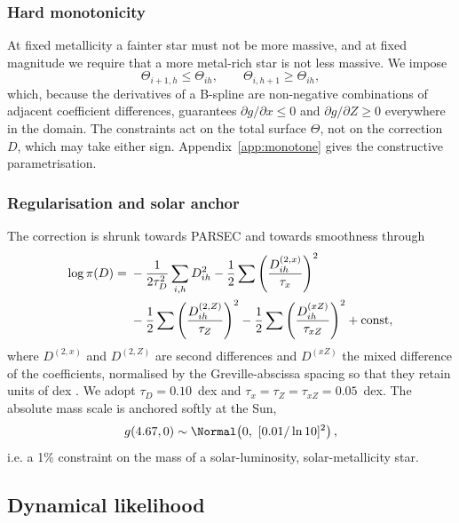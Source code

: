 \subsubsection{Hard monotonicity}

At fixed metallicity a fainter star must not be more massive, and at fixed
magnitude we require that a more metal-rich star is not less massive.  We
impose
\begin{equation}
 \Theta_{i+1,h}\le\Theta_{ih},\qquad
 \Theta_{i,h+1}\ge\Theta_{ih},
 \label{eq:coefficient-order}
\end{equation}
which, because the derivatives of a B-spline are non-negative combinations of
adjacent coefficient differences, guarantees $\partial g/\partial x\le0$ and
$\partial g/\partial Z\ge0$ everywhere in the domain.  The constraints act on
the total surface $\Theta$, not on the correction $D$, which may take either
sign.  Appendix~\ref{app:monotone} gives the constructive parametrisation.

\subsubsection{Regularisation and solar anchor}

The correction is shrunk towards PARSEC and towards smoothness through
\begin{equation}
\begin{aligned}
 \log\pi(D)={}&-\frac{1}{2\tau_D^2}\sum_{i,h}D_{ih}^2
 -\frac{1}{2}\sum\left(\frac{D^{(2,x)}_{ih}}{\tau_x}\right)^2\\
 &-\frac{1}{2}\sum\left(\frac{D^{(2,Z)}_{ih}}{\tau_Z}\right)^2
 -\frac{1}{2}\sum\left(\frac{D^{(xZ)}_{ih}}{\tau_{xZ}}\right)^2+{\rm const},
\end{aligned}
 \label{eq:shrink}
\end{equation}
where $D^{(2,x)}$ and $D^{(2,Z)}$ are second differences and $D^{(xZ)}$ the
mixed difference of the coefficients, normalised by the Greville-abscissa
spacing so that they retain units of dex \citep{EilersMarx1996PSplines}.  We
adopt $\tau_D=0.10$~dex and $\tau_x=\tau_Z=\tau_{xZ}=0.05$~dex.  The absolute
mass scale is anchored softly at the Sun,
\begin{equation}
 g(4.67,0)\sim\Normal\!\left(0,\ [0.01/\ln10]^2\right),
 \label{eq:solar}
\end{equation}
i.e. a 1\% constraint on the mass of a solar-luminosity, solar-metallicity
star.

\subsection{Dynamical likelihood}
\label{sec:dynamics}


